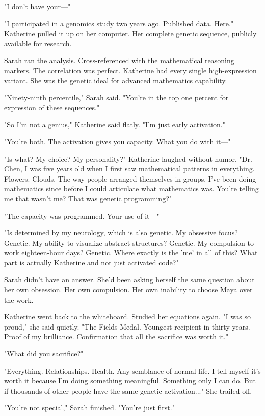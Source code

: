 "I don't have your—"

"I participated in a genomics study two years ago. Published data. Here." Katherine pulled it up on her computer. Her complete genetic sequence, publicly available for research.

Sarah ran the analysis. Cross-referenced with the mathematical reasoning markers. The correlation was perfect. Katherine had every single high-expression variant. She was the genetic ideal for advanced mathematics capability.

"Ninety-ninth percentile," Sarah said. "You're in the top one percent for expression of these sequences."

"So I'm not a genius," Katherine said flatly. "I'm just early activation."

"You're both. The activation gives you capacity. What you do with it—"

"Is what? My choice? My personality?" Katherine laughed without humor. "Dr. Chen, I was five years old when I first saw mathematical patterns in everything. Flowers. Clouds. The way people arranged themselves in groups. I've been doing mathematics since before I could articulate what mathematics was. You're telling me that wasn't me? That was genetic programming?"

"The capacity was programmed. Your use of it—"

"Is determined by my neurology, which is also genetic. My obsessive focus? Genetic. My ability to visualize abstract structures? Genetic. My compulsion to work eighteen-hour days? Genetic. Where exactly is the 'me' in all of this? What part is actually Katherine and not just activated code?"

Sarah didn't have an answer. She'd been asking herself the same question about her own obsession. Her own compulsion. Her own inability to choose Maya over the work.

Katherine went back to the whiteboard. Studied her equations again. "I was so proud," she said quietly. "The Fields Medal. Youngest recipient in thirty years. Proof of my brilliance. Confirmation that all the sacrifice was worth it."

"What did you sacrifice?"

"Everything. Relationships. Health. Any semblance of normal life. I tell myself it's worth it because I'm doing something meaningful. Something only I can do. But if thousands of other people have the same genetic activation..." She trailed off.

"You're not special," Sarah finished. "You're just first."

